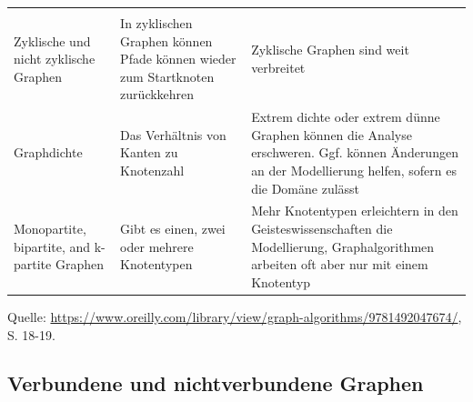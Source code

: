 \documentclass[ngerman,]{scrreprt}
\begin{document}
\begin{longtable}[]{@{}lll@{}}
\begin{minipage}[t]{0.59\columnwidth}
\end{minipage}\tabularnewline
\begin{minipage}[t]{0.14\columnwidth}\raggedright\strut
Zyklische und nicht zyklische Graphen\strut
\end{minipage} & \begin{minipage}[t]{0.18\columnwidth}\raggedright\strut
In zyklischen Graphen können Pfade können wieder zum Startknoten zurückkehren\strut
\end{minipage} & \begin{minipage}[t]{0.59\columnwidth}\raggedright\strut
Zyklische Graphen sind weit verbreitet\strut
\end{minipage}\tabularnewline
\begin{minipage}[t]{0.14\columnwidth}\raggedright\strut
Graphdichte\strut
\end{minipage} & \begin{minipage}[t]{0.18\columnwidth}\raggedright\strut
Das Verhältnis von Kanten zu Knotenzahl\strut
\end{minipage} & \begin{minipage}[t]{0.59\columnwidth}\raggedright\strut
Extrem dichte oder extrem dünne Graphen können die Analyse erschweren. Ggf. können Änderungen an der Modellierung helfen, sofern es die Domäne zulässt\strut
\end{minipage}\tabularnewline
\begin{minipage}[t]{0.14\columnwidth}\raggedright\strut
Monopartite, bipartite, and k-partite Graphen\strut
\end{minipage} & \begin{minipage}[t]{0.18\columnwidth}\raggedright\strut
Gibt es einen, zwei oder mehrere Knotentypen\strut
\end{minipage} & \begin{minipage}[t]{0.59\columnwidth}\raggedright\strut
Mehr Knotentypen erleichtern in den Geisteswissenschaften die Modellierung, Graphalgorithmen arbeiten oft aber nur mit einem Knotentyp\strut
\end{minipage}\tabularnewline
\bottomrule
\end{longtable}

Quelle: \href{Needham/Hodler\%202019}{https://www.oreilly.com/library/view/graph-algorithms/9781492047674/}, S. 18-19.

\subsection{Verbundene und nichtverbundene Graphen}\label{verbundene-und-nichtverbundene-graphen}
\end{document}
